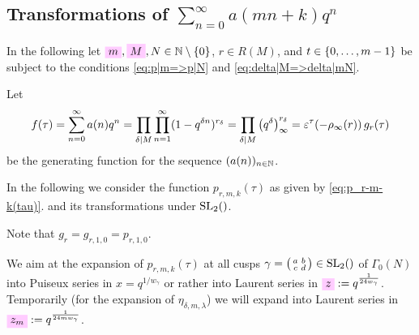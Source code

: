 \documentclass{article}
\begin{document}
\begin{Hemmecke}


\subsection{Transformations of $\sum_{n=0}^\infty a(mn+k) q^n$}
\label{sec:p_r-m-k}

In the following let $\defineNotation[m]{m}, \defineNotation[M]{M}, N
\in \setN \setminus \Set{0}$, $r \in
R(M)$, and
$t\in\left\{0,\ldots,m-1\right\}$ be subject to the conditions
\eqref{eq:p|m=>p|N} and \eqref{eq:delta|M=>delta|mN}.


Let
\begin{gather*}
  f(\tau)
  =
  \sum_{n=0}^\infty a(n) q^n
  =
  \prod_{\delta \mid M}\prod_{n=1}^\infty(1-q^{\delta n})^{r_\delta}
  =
  \prod_{\delta \mid M}\left({q}^{\delta}\right)_{\infty}^{r_\delta}
  =
  \varepsilon^\tau\!\left(-\rho_\infty(r)\right) g_r(\tau)
\end{gather*}
be the generating function for the sequence $(a(n))_{n\in\mathbb{N}}$.

In the following we consider the function
$p_{r,m,k}(\tau)$ as given by \eqref{eq:p_r-m-k(tau)}.
and its transformations under $\SL2Z$.

Note that $g_r = g_{r,1,0}=p_{r,1,0}$.

We aim at the expansion of $p_{r,m,k}(\tau)$ at all cusps
$\gamma = \left(
  \begin{smallmatrix}a&b\\c&d\end{smallmatrix} \right)\in \SL2Z$
of $\Gamma_0(N)$ into Puiseux series in $x=q^{1/w_\gamma}$ or rather
into Laurent series in
$\defineNotation[z]{z} := q^{\frac{1}{24 w_\gamma}}$. Temporarily (for
the expansion of $\eta_{\delta,m,\lambda}$) we will expand into
Laurent series in
$\defineNotation[z-m]{z_m} := q^{\frac{1}{24 m w_\gamma}}$.


\end{Hemmecke}
\end{document}
